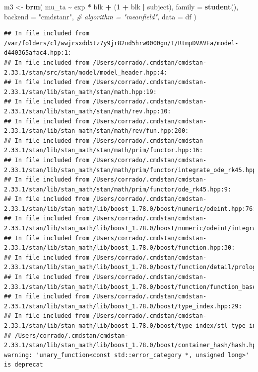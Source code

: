 \documentclass[
]{article}
\newenvironment{Shaded}{\begin{snugshade}}{\end{snugshade}}
\newcommand{\AttributeTok}[1]{\textcolor[rgb]{0.13,0.29,0.53}{#1}}
\newcommand{\CommentTok}[1]{\textcolor[rgb]{0.56,0.35,0.01}{\textit{#1}}}
\newcommand{\DecValTok}[1]{\textcolor[rgb]{0.00,0.00,0.81}{#1}}
\newcommand{\FunctionTok}[1]{\textcolor[rgb]{0.13,0.29,0.53}{\textbf{#1}}}
\newcommand{\NormalTok}[1]{#1}
\newcommand{\OtherTok}[1]{\textcolor[rgb]{0.56,0.35,0.01}{#1}}
\newcommand{\SpecialCharTok}[1]{\textcolor[rgb]{0.81,0.36,0.00}{\textbf{#1}}}
\newcommand{\StringTok}[1]{\textcolor[rgb]{0.31,0.60,0.02}{#1}}
\begin{document}
\begin{Shaded}
\begin{Highlighting}[]
\NormalTok{m3 }\OtherTok{\textless{}{-}} \FunctionTok{brm}\NormalTok{(}
\NormalTok{  mu\_ta }\SpecialCharTok{\textasciitilde{}}\NormalTok{ exp }\SpecialCharTok{*}\NormalTok{ blk }\SpecialCharTok{+}\NormalTok{ (}\DecValTok{1} \SpecialCharTok{+}\NormalTok{ blk }\SpecialCharTok{|}\NormalTok{ subject),}
  \AttributeTok{family =} \FunctionTok{student}\NormalTok{(),}
  \AttributeTok{backend =} \StringTok{"cmdstanr"}\NormalTok{,}
  \CommentTok{\# algorithm = "meanfield",}
  \AttributeTok{data =}\NormalTok{ df}
\NormalTok{)}
\end{Highlighting}
\end{Shaded}

\begin{verbatim}
## In file included from /var/folders/cl/wwjrsxdd5tz7y9jr82nd5hrw0000gn/T/RtmpDVAVEa/model-d440365afac4.hpp:1:
## In file included from /Users/corrado/.cmdstan/cmdstan-2.33.1/stan/src/stan/model/model_header.hpp:4:
## In file included from /Users/corrado/.cmdstan/cmdstan-2.33.1/stan/lib/stan_math/stan/math.hpp:19:
## In file included from /Users/corrado/.cmdstan/cmdstan-2.33.1/stan/lib/stan_math/stan/math/rev.hpp:10:
## In file included from /Users/corrado/.cmdstan/cmdstan-2.33.1/stan/lib/stan_math/stan/math/rev/fun.hpp:200:
## In file included from /Users/corrado/.cmdstan/cmdstan-2.33.1/stan/lib/stan_math/stan/math/prim/functor.hpp:16:
## In file included from /Users/corrado/.cmdstan/cmdstan-2.33.1/stan/lib/stan_math/stan/math/prim/functor/integrate_ode_rk45.hpp:6:
## In file included from /Users/corrado/.cmdstan/cmdstan-2.33.1/stan/lib/stan_math/stan/math/prim/functor/ode_rk45.hpp:9:
## In file included from /Users/corrado/.cmdstan/cmdstan-2.33.1/stan/lib/stan_math/lib/boost_1.78.0/boost/numeric/odeint.hpp:76:
## In file included from /Users/corrado/.cmdstan/cmdstan-2.33.1/stan/lib/stan_math/lib/boost_1.78.0/boost/numeric/odeint/integrate/observer_collection.hpp:23:
## In file included from /Users/corrado/.cmdstan/cmdstan-2.33.1/stan/lib/stan_math/lib/boost_1.78.0/boost/function.hpp:30:
## In file included from /Users/corrado/.cmdstan/cmdstan-2.33.1/stan/lib/stan_math/lib/boost_1.78.0/boost/function/detail/prologue.hpp:17:
## In file included from /Users/corrado/.cmdstan/cmdstan-2.33.1/stan/lib/stan_math/lib/boost_1.78.0/boost/function/function_base.hpp:21:
## In file included from /Users/corrado/.cmdstan/cmdstan-2.33.1/stan/lib/stan_math/lib/boost_1.78.0/boost/type_index.hpp:29:
## In file included from /Users/corrado/.cmdstan/cmdstan-2.33.1/stan/lib/stan_math/lib/boost_1.78.0/boost/type_index/stl_type_index.hpp:47:
## /Users/corrado/.cmdstan/cmdstan-2.33.1/stan/lib/stan_math/lib/boost_1.78.0/boost/container_hash/hash.hpp:132:33: warning: 'unary_function<const std::error_category *, unsigned long>' is deprecat
\end{verbatim}
\end{document}
